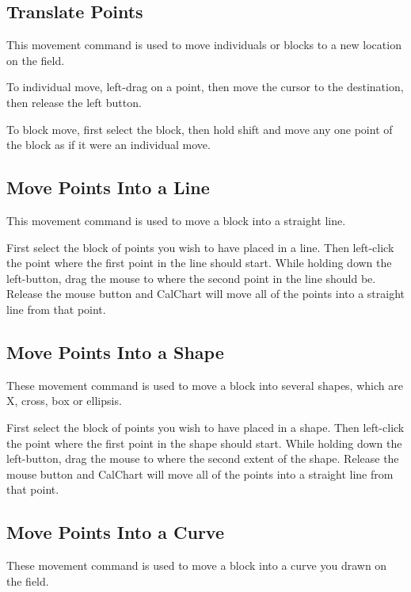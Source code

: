 \subsection{Translate Points}\label{translatepoints}

This movement command is used to move individuals or blocks to a new location
on the field.

To individual move, left-drag on a point, then move the cursor
to the destination, then release the left button.

To block move, first select
the block, then hold shift and move any one point of the block as if it
were an individual move.

\subsection{Move Points Into a Line}\label{movepointsintoaline}

This movement command is used to move a block into a straight line.

First select the block of points you wish to have placed in a line.  Then
left-click the point where the first point in the line should start.  While
holding down the left-button, drag the mouse to where the second point in the
line should be.  Release the mouse button and CalChart will move all of the 
points into a straight line from that point.

\subsection{Move Points Into a Shape}\label{movepointsintoashape}

These movement command is used to move a block into several shapes, which are X, cross, box or ellipsis.

First select the block of points you wish to have placed in a shape.  Then
left-click the point where the first point in the shape should start.  While
holding down the left-button, drag the mouse to where the second extent of the shape.
Release the mouse button and CalChart will move all of the 
points into a straight line from that point.

\subsection{Move Points Into a Curve}\label{movepointsintoacurve}

These movement command is used to move a block into a curve you drawn on the field.


